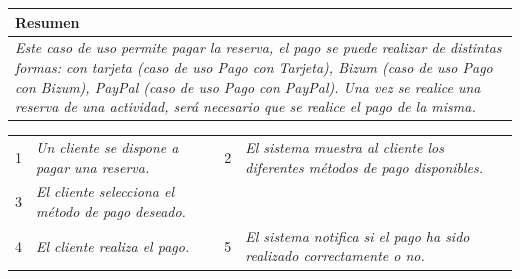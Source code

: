         \begin{table}[H]
            \begin{tabular}{llllllll}
        \hline
        \multicolumn{8}{|l|}{\cellcolor[HTML]{F2F2F2}Resumen}                                                                                                                                                                                                                                                                                                                                                                                             \\ \hline
        \multicolumn{8}{|p{15cm}|}{{\color[HTML]{808080} \textit{Este caso de uso permite pagar la reserva, el pago se puede realizar de distintas formas: con tarjeta (caso de uso Pago con Tarjeta), Bizum (caso de uso Pago con Bizum), PayPal (caso de uso Pago con PayPal). Una vez se realice una reserva de una actividad, será necesario que se realice el pago de la misma.}}} \\ \hline
        \end{tabular}
        \end{table}

        \begin{table}[h!]
        \centering
        \begin{tabular}{|p{0.6cm}|p{6.5cm}|p{0.6cm}|p{6.5cm}|}
        \rowcolor{lightgray}
        \hline
        \multicolumn{4}{|l|}{Curso Normal (Básico)} \\
        \hline
        1 & \color[HTML]{808080}\textit{Un cliente se dispone a pagar una reserva.} & 2 & \color[HTML]{808080}\textit{El sistema muestra al cliente los diferentes métodos de pago disponibles.} \\
        \hline
        3 & \color[HTML]{808080}\textit{El cliente selecciona el método de pago deseado.} & & \\
        \hline
        4 & \color[HTML]{808080}\textit{El cliente realiza el pago.} & 5 & \color[HTML]{808080}\textit{El sistema notifica si el pago ha sido realizado correctamente o no.} \\
        \hline
        \end{tabular}
        \end{table}

